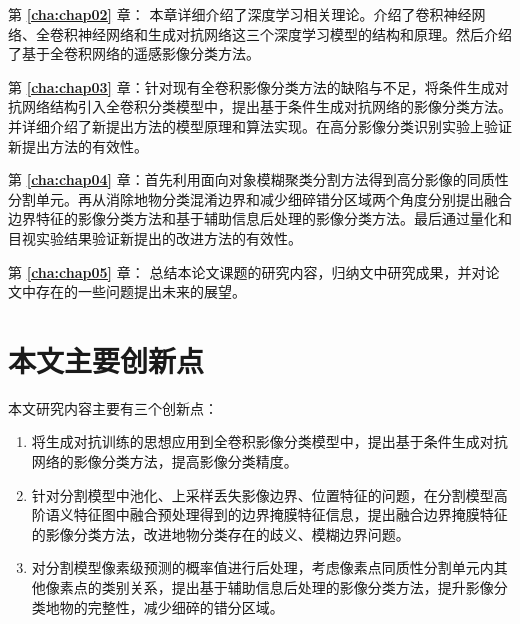 第 \textbf{\ref{cha:chap02}} 章： 本章详细介绍了深度学习相关理论。介绍了卷积神经网络、全卷积神经网络和生成对抗网络这三个深度学习模型的结构和原理。然后介绍了基于全卷积网络的遥感影像分类方法。


第 \textbf{\ref{cha:chap03}} 章：针对现有全卷积影像分类方法的缺陷与不足，将条件生成对抗网络结构引入全卷积分类模型中，提出基于条件生成对抗网络的影像分类方法。并详细介绍了新提出方法的模型原理和算法实现。在高分影像分类识别实验上验证新提出方法的有效性。

第 \textbf{\ref{cha:chap04}} 章：首先利用面向对象模糊聚类分割方法得到高分影像的同质性分割单元。再从消除地物分类混淆边界和减少细碎错分区域两个角度分别提出融合边界特征的影像分类方法和基于辅助信息后处理的影像分类方法。最后通过量化和目视实验结果验证新提出的改进方法的有效性。

第 \textbf{\ref{cha:chap05}} 章： 总结本论文课题的研究内容，归纳文中研究成果，并对论文中存在的一些问题提出未来的展望。


\section{本文主要创新点}
\label{sec:forth}
本文研究内容主要有三个创新点：
\begin{enumerate}[(1)]
    \item 将生成对抗训练的思想应用到全卷积影像分类模型中，提出基于条件生成对抗网络的影像分类方法，提高影像分类精度。
    \item 针对分割模型中池化、上采样丢失影像边界、位置特征的问题，在分割模型高阶语义特征图中融合预处理得到的边界掩膜特征信息，提出融合边界掩膜特征的影像分类方法，改进地物分类存在的歧义、模糊边界问题。
    \item 对分割模型像素级预测的概率值进行后处理，考虑像素点同质性分割单元内其他像素点的类别关系，提出基于辅助信息后处理的影像分类方法，提升影像分类地物的完整性，减少细碎的错分区域。

\end{enumerate}
